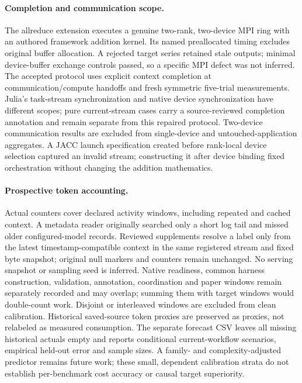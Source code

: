 \paragraph{Completion and communication scope.}
The allreduce extension executes a genuine two-rank, two-device MPI ring with an authored framework addition kernel. Its named preallocated timing excludes original buffer allocation. A rejected target series retained stale outputs; minimal device-buffer exchange controls passed, so a specific MPI defect was not inferred. The accepted protocol uses explicit context completion at communication/compute handoffs and fresh symmetric five-trial measurements. Julia's task-stream synchronization and native device synchronization have different scopes; pure current-stream cases carry a source-reviewed completion annotation and remain separate from this repaired protocol. Two-device communication results are excluded from single-device and untouched-application aggregates. A JACC launch specification created before rank-local device selection captured an invalid stream; constructing it after device binding fixed orchestration without changing the addition mathematics.

\paragraph{Prospective token accounting.}
Actual counters cover declared activity windows, including repeated and cached context. A metadata reader originally searched only a short log tail and missed older configured-model records. Reviewed supplements resolve a label only from the latest timestamp-compatible context in the same registered stream and fixed byte snapshot; original null markers and counters remain unchanged. No serving snapshot or sampling seed is inferred. Native readiness, common harness construction, validation, annotation, coordination and paper windows remain separately recorded and may overlap; summing them with target windows would double-count work. Disjoint or interleaved windows are excluded from clean calibration. Historical saved-source token proxies are preserved as proxies, not relabeled as measured consumption. The separate forecast CSV leaves all missing historical actuals empty and reports conditional current-workflow scenarios, empirical held-out error and sample sizes. A family- and complexity-adjusted predictor remains future work; these small, dependent calibration strata do not establish per-benchmark cost accuracy or causal target superiority.


